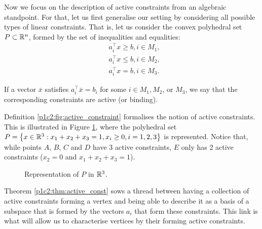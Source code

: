 Now we focus on the description of active constraints from an algebraic standpoint. For that, let us first generalise our setting by considering all possible types of linear constraints. That is, let us consider the convex polyhedral set $P \subset \mathbb{R}^n$, formed by the set of inequalities and equalities:
%
\begin{align*}
	& a_i^\top x \geq b, i \in M_1, \\ 
	& a_i^\top x \leq b, i \in M_2, \\
	& a_i^\top x = b, i \in M_3.
\end{align*}

\begin{definition} \label{p1c2:fig:active_constraint}
	If a vector $\overline{x}$ satisfies $a_i^\top \overline{x} = b_i$ for some $i \in M_1, M_2$, or $M_3$, we say that the corresponding constraints are active (or binding).
\end{definition}

Definition \ref{p1c2:fig:active_constraint} formalises the notion of active constraints. This is illustrated in Figure \ref{p1c2:fig:active_constraints}, where the polyhedral set $P = \left\{ x \in \mathbb{R}^3 : x_1 + x_2 + x_3 = 1, x_i \geq 0, i =1,2,3 \right \}$ is represented. Notice that, while points $A$, $B$, $C$ and $D$ have 3 active constraints, $E$ only has 2 active constraints ($x_2 = 0$ and $x_1 + x_2 + x_3 = 1$).

\begin{figure}[h]
	\caption{Representation of $P$ in $\mathbb{R}^3$.} \label{p1c2:fig:active_constraints}
\end{figure}	

Theorem \ref{p1c2:thm:active_const} sows a thread between having a collection of active constraints forming a vertex and being able to describe it as a basis of a subspace that is formed by the vectors $a_i$ that form these constraints. This link is what will allow us to characterise vertices by their forming active constraints.

